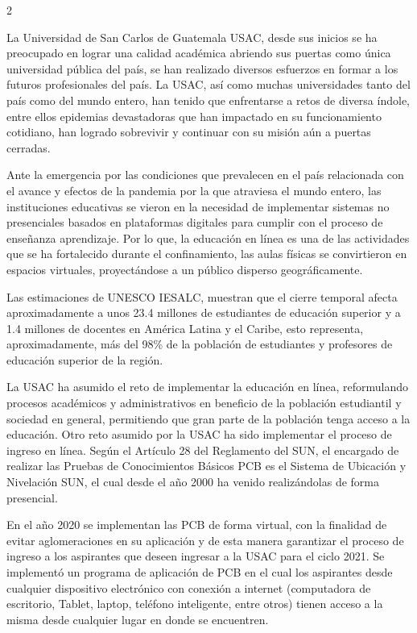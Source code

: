 \documentclass[12pt,spanish,Letterpaper,openany]{book}
\begin{document}
\begin {multicols}{2}

La Universidad de San Carlos de Guatemala USAC, desde sus inicios se ha preocupado en lograr una calidad académica abriendo sus puertas como única universidad pública del país, se han realizado diversos esfuerzos en formar a los futuros profesionales del país. La USAC, así como muchas universidades tanto del país como del mundo entero, han tenido que enfrentarse a retos de diversa índole, entre ellos epidemias devastadoras que han impactado en su funcionamiento cotidiano, han logrado sobrevivir y continuar con su misión aún a puertas cerradas.

Ante la emergencia por las condiciones que prevalecen en el país relacionada con el avance y efectos de la pandemia por la que atraviesa el mundo entero, las instituciones educativas se vieron en la necesidad de implementar sistemas no presenciales basados en plataformas digitales para cumplir con el proceso de enseñanza aprendizaje. Por lo que, la educación en línea es una de las actividades que se ha fortalecido durante el confinamiento, las aulas físicas se convirtieron en espacios virtuales, proyectándose a un público disperso geográficamente.

Las estimaciones de UNESCO IESALC, muestran que el cierre temporal afecta aproximadamente a unos 23.4 millones de estudiantes de educación superior y a 1.4 millones de docentes en América Latina y el Caribe, esto representa, aproximadamente, más del 98\% de la población de estudiantes y profesores de educación superior de la región.

La USAC ha asumido el reto de implementar la educación en línea, reformulando procesos académicos y administrativos en beneficio de la población estudiantil y sociedad en general, permitiendo que gran parte de la población tenga acceso a la educación. Otro reto asumido por la USAC ha sido implementar el proceso de ingreso en línea. Según el Artículo 28 del Reglamento del SUN, el encargado de realizar las Pruebas de Conocimientos Básicos PCB es el Sistema de Ubicación y Nivelación SUN, el cual desde el año 2000 ha venido realizándolas de forma presencial.

En el año 2020 se implementan las PCB de forma virtual, con la finalidad de evitar aglomeraciones en su aplicación y de esta manera garantizar el proceso de ingreso a los aspirantes que deseen ingresar a la USAC para el ciclo 2021. Se implementó un programa de aplicación de PCB en el cual los aspirantes desde cualquier dispositivo electrónico con conexión a internet (computadora de escritorio, Tablet, laptop, teléfono inteligente, entre otros) tienen acceso a la misma desde cualquier lugar en donde se encuentren.


\end{multicols}
\end{document}
